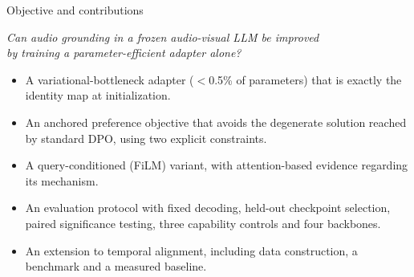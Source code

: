 \documentclass[aspectratio=169,11pt]{beamer}
\begin{document}
\begin{frame}{Objective and contributions}
\begin{center}\large\itshape
Can audio grounding in a frozen audio-visual LLM be improved\\[2pt]
by training a parameter-efficient adapter alone?
\end{center}
\vspace{0.3em}
\begin{itemize}\footnotesize
\item[\textbf{C1}] A variational-bottleneck adapter ($<$0.5\% of parameters) that is exactly the
identity map at initialization.
\item[\textbf{C2}] An anchored preference objective that avoids the degenerate solution reached by
standard DPO, using two explicit constraints.
\item[\textbf{C3}] A query-conditioned (FiLM) variant, with attention-based evidence regarding its
mechanism.
\item[\textbf{C4}] An evaluation protocol with fixed decoding, held-out checkpoint selection, paired
significance testing, three capability controls and four backbones.
\item[\textbf{C5}] An extension to temporal alignment, including data construction, a benchmark and
a measured baseline.
\end{itemize}
\end{frame}

\end{document}
